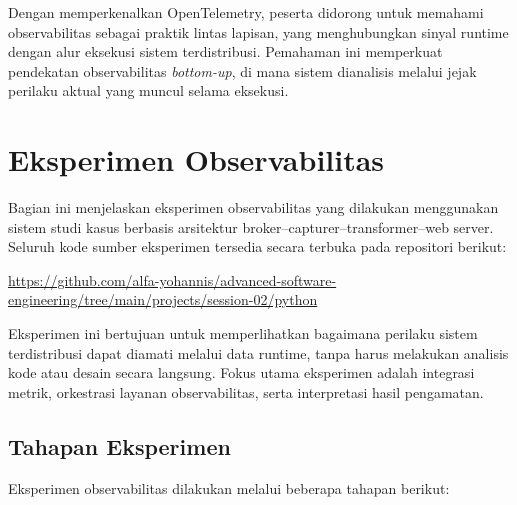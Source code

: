 Dengan memperkenalkan OpenTelemetry, peserta didorong untuk memahami observabilitas sebagai praktik lintas lapisan, yang menghubungkan sinyal runtime dengan alur eksekusi sistem terdistribusi. Pemahaman ini memperkuat pendekatan observabilitas \emph{bottom-up}, di mana sistem dianalisis melalui jejak perilaku aktual yang muncul selama eksekusi.



\section{Eksperimen Observabilitas}

Bagian ini menjelaskan eksperimen observabilitas yang dilakukan menggunakan sistem studi kasus berbasis arsitektur broker--capturer--transformer--web server. Seluruh kode sumber eksperimen tersedia secara terbuka pada repositori berikut:

\noindent\url{https://github.com/alfa-yohannis/advanced-software-engineering/tree/main/projects/session-02/python}

Eksperimen ini bertujuan untuk memperlihatkan bagaimana perilaku sistem terdistribusi dapat diamati melalui data runtime, tanpa harus melakukan analisis kode atau desain secara langsung. Fokus utama eksperimen adalah integrasi metrik, orkestrasi layanan observabilitas, serta interpretasi hasil pengamatan.

\subsection{Tahapan Eksperimen}

Eksperimen observabilitas dilakukan melalui beberapa tahapan berikut:

